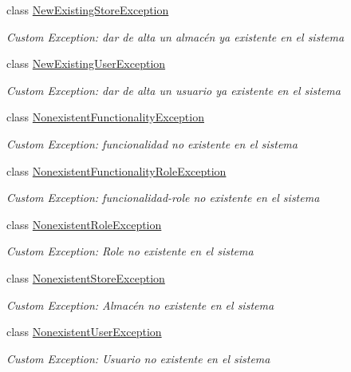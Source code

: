 \begin{DoxyCompactItemize}
class \hyperlink{class_h_k_supply_1_1_exceptions_1_1_new_existing_store_exception}{New\+Existing\+Store\+Exception}
\begin{DoxyCompactList}\small\item\em Custom Exception\+: dar de alta un almacén ya existente en el sistema \end{DoxyCompactList}\item 
class \hyperlink{class_h_k_supply_1_1_exceptions_1_1_new_existing_user_exception}{New\+Existing\+User\+Exception}
\begin{DoxyCompactList}\small\item\em Custom Exception\+: dar de alta un usuario ya existente en el sistema \end{DoxyCompactList}\item 
class \hyperlink{class_h_k_supply_1_1_exceptions_1_1_nonexistent_functionality_exception}{Nonexistent\+Functionality\+Exception}
\begin{DoxyCompactList}\small\item\em Custom Exception\+: funcionalidad no existente en el sistema \end{DoxyCompactList}\item 
class \hyperlink{class_h_k_supply_1_1_exceptions_1_1_nonexistent_functionality_role_exception}{Nonexistent\+Functionality\+Role\+Exception}
\begin{DoxyCompactList}\small\item\em Custom Exception\+: funcionalidad-\/role no existente en el sistema \end{DoxyCompactList}\item 
class \hyperlink{class_h_k_supply_1_1_exceptions_1_1_nonexistent_role_exception}{Nonexistent\+Role\+Exception}
\begin{DoxyCompactList}\small\item\em Custom Exception\+: Role no existente en el sistema \end{DoxyCompactList}\item 
class \hyperlink{class_h_k_supply_1_1_exceptions_1_1_nonexistent_store_exception}{Nonexistent\+Store\+Exception}
\begin{DoxyCompactList}\small\item\em Custom Exception\+: Almacén no existente en el sistema \end{DoxyCompactList}\item 
class \hyperlink{class_h_k_supply_1_1_exceptions_1_1_nonexistent_user_exception}{Nonexistent\+User\+Exception}
\begin{DoxyCompactList}\small\item\em Custom Exception\+: Usuario no existente en el sistema \end{DoxyCompactList}\end{DoxyCompactItemize}
